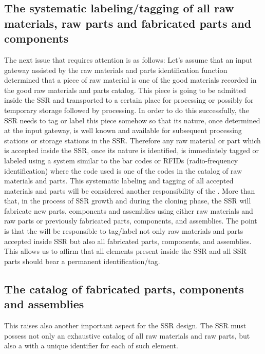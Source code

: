 \subsection[The systematic labeling/tagging of all raw materials, raw
parts and fabricated parts and components]{The systematic
labeling/tagging of all raw materials, raw parts and fabricated parts
and components}

The next issue that requires
attention is as follows: Let’s assume that an input gateway
assisted by the raw materials and parts identification function
determined that a piece of raw material is one of the good materials
recorded in the good raw materials and parts catalog. This piece is
going to be admitted inside the SSR and transported to a certain place
for processing or possibly for temporary storage followed by
processing.  In order to do this successfully, the SSR needs
to tag or label this piece somehow so that its nature, once
determined at the input gateway, is well known and available for
subsequent processing stations or storage stations in the SSR. Therefore
any raw material or part which is accepted inside the SSR, once
its nature is identified, is immediately tagged or labeled using a system
similar to the bar codes or RFIDs (radio-frequency identification)
where the code used is one of the codes in the catalog of raw materials
and parts. This systematic labeling and tagging of all accepted
materials and parts will be considered another responsibility of the
.  More than that,
in the process of SSR growth and during the cloning
phase, the SSR will fabricate new parts, components and assemblies
using either raw materials and raw parts or previously fabricated
parts, components, and assemblies. The point is that the 
will be responsible to tag/label not
only raw materials and parts accepted inside SSR but also all
fabricated parts, components, and assemblies. This allows us to affirm
that all elements present inside the SSR and all SSR parts should bear
a permanent identification/tag.

\subsection[The catalog of fabricated parts, components and
assemblies]{The catalog of fabricated parts, components and assemblies}

This raises also another
important aspect for the SSR design. The SSR must possess not only an
exhaustive catalog of all raw materials and raw parts, but also a
with a unique identifier for each  of such element. 

